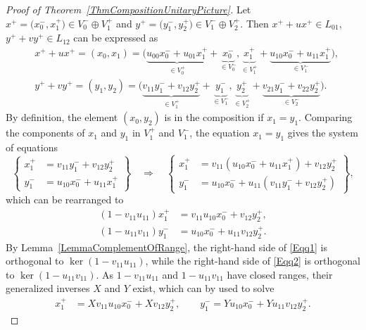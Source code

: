 \documentclass[10pt,a4paper]{amsart}
\numberwithin{equation}{section}
\begin{document}
\begin{proof}[Proof of Theorem~\ref{ThmCompositionUnitaryPicture}]
Let $x^+ = \big(x_0^-, x_1^+\big) \in V_0^- \oplus V_1^+$ and $y^+ = \big(y_1^-, y_2^+\big) \in V_1^-\oplus V_2^+$.
Then $x^+ + ux^+ \in L_{01}$, $y^+ +vy^+ \in L_{12}$ can be expressed as
\begin{align}
& x^++ux^+= (x_0, x_1) = \big(\underbrace{u_{00} x_0^- + u_{01}x_1^+}_{ \in V_0^+} + \underbrace{x_0^-}_{\in V_0^-}, \underbrace{x_1^+}_{\in V_1^+} + \underbrace{u_{10} x_0^- + u_{11} x_1^+}_{\in V_1^-}\big),\nonumber\\
&y^++vy^+= (y_1, y_2) = \big(\underbrace{v_{11} y_1^- + v_{12}y_2^+}_{ \in V_1^+} + \underbrace{y_1^-}_{\in V_1^-}, \underbrace{y_2^+}_{\in V_2^+} + \underbrace{v_{21} y_1^- + v_{22} y_2^+}_{\in V_2^-}\big).\label{ElementsOfComposition}
\end{align}
By definition, the element $(x_0, y_2)$ is in the composition if $x_1 = y_1$.
Comparing the components of $x_1$ and $y_1$ in $V_1^+$ and $V_1^-$, the equation $x_1 = y_1$ gives the system of equations
\begin{equation*}
\left\{\begin{aligned}
x_1^+ &= v_{11} y_1^- + v_{12}y_2^+\\
y_1^- &= u_{10} x_0^- + u_{11} x_1^+
\end{aligned}\right\}
\quad \Longrightarrow \quad
\left\{\begin{aligned}
x_1^+ &= v_{11} (u_{10} x_0^- + u_{11} x_1^+) + v_{12}y_2^+\\
y_1^- &= u_{10} x_0^- + u_{11} ( v_{11} y_1^- + v_{12}y_2^+)
\end{aligned}\right\},
\end{equation*}
which can be rearranged to
\begin{align}
(1- v_{11}u_{11})x_1^+ &= v_{11} u_{10} x_0^- + v_{12}y_2^+, \label{Eqq1}\\
(1-u_{11}v_{11})y_1^- &= u_{10} x_0^- + u_{11}v_{12}y_2^+.\label{Eqq2}
\end{align}
By Lemma~\ref{LemmaComplementOfRange}, the right-hand side of \eqref{Eqq1} is orthogonal to $\ker(1- v_{11}u_{11})$, while the right-hand side of \eqref{Eqq2} is orthogonal to $\ker(1- u_{11}v_{11})$.
As $1- v_{11}u_{11}$ and $1-u_{11}v_{11}$ have closed ranges, their generalized inverses $X$ and $Y$ exist, which can by used to solve
 \begin{align}
x_1^+ &= Xv_{11} u_{10} x_0^- + Xv_{12}y_2^+,\qquad
y_1^- = Yu_{10} x_0^- + Yu_{11}v_{12}y_2^+.\label{Solutionx1y1}
\end{align}

\end{proof}
\end{document}
